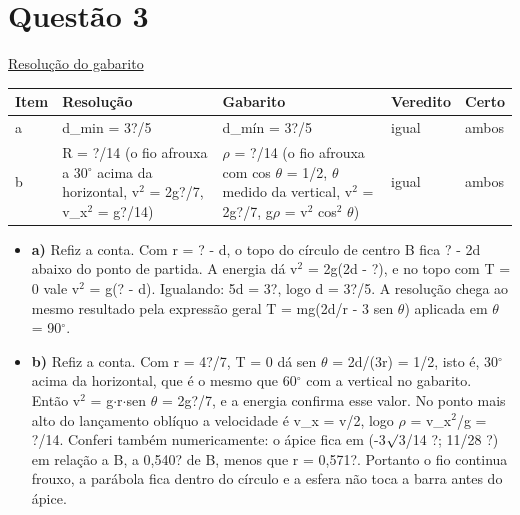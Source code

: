 \documentclass{article}%
\begin{document}
\section*{Questão 3}%
\href{https://poliedroresolve.sistemapoliedro.com.br/vestibulares/ime/2026/ime-2-fase-dia-2-24-10-2025-2-fase-dia-2/dissertativa-3-fisica-2-fase-dia-2-ime-2026}{Resolução do gabarito}\par\smallskip%
\begin{longtable}{@{}p{} p{} p{} p{} p{}@{}}\toprule Item & Resolução & Gabarito & Veredito & Certo \\ \midrule
a & d\_min = 3?/5 & d\_mín = 3?/5 & igual & ambos \\
b & R = ?/14 (o fio afrouxa a 30$^\circ$ acima da horizontal, v$^2$ = 2g?/7, v\_x$^2$ = g?/14) & $\rho$ = ?/14 (o fio afrouxa com cos $\theta$ = 1/2, $\theta$ medido da vertical, v$^2$ = 2g?/7, g$\rho$ = v$^2$ cos$^2$ $\theta$) & igual & ambos \\
\bottomrule\end{longtable}%
\begin{itemize}%
\item%
\textbf{a)} Refiz a conta. Com r = ? - d, o topo do círculo de centro B fica ? - 2d abaixo do ponto de partida. A energia dá v$^2$ = 2g(2d - ?), e no topo com T = 0 vale v$^2$ = g(? - d). Igualando: 5d = 3?, logo d = 3?/5. A resolução chega ao mesmo resultado pela expressão geral T = mg(2d/r - 3 sen $\theta$) aplicada em $\theta$ = 90$^\circ$.%
\item%
\textbf{b)} Refiz a conta. Com r = 4?/7, T = 0 dá sen $\theta$ = 2d/(3r) = 1/2, isto é, 30$^\circ$ acima da horizontal, que é o mesmo que 60$^\circ$ com a vertical no gabarito. Então v$^2$ = g$\cdot$r$\cdot$sen $\theta$ = 2g?/7, e a energia confirma esse valor. No ponto mais alto do lançamento oblíquo a velocidade é v\_x = v/2, logo $\rho$ = v\_x$^2$/g = ?/14. Conferi também numericamente: o ápice fica em (-3$\surd$3/14 ?; 11/28 ?) em relação a B, a 0,540? de B, menos que r = 0,571?. Portanto o fio continua frouxo, a parábola fica dentro do círculo e a esfera não toca a barra antes do ápice.%
\end{itemize}%
\end{document}
